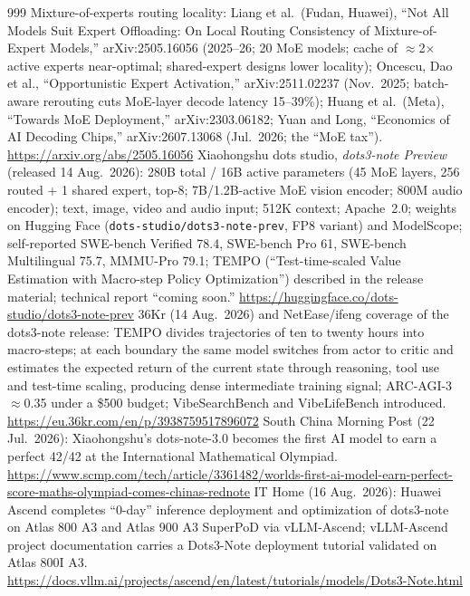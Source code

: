 \begin{thebibliography}{999}
 Mixture-of-experts routing locality: Liang et al.\ (Fudan, Huawei), ``Not All Models Suit Expert Offloading: On Local Routing Consistency of Mixture-of-Expert Models,'' arXiv:2505.16056 (2025--26; 20 MoE models; cache of $\approx$2$\times$ active experts near-optimal; shared-expert designs lower locality); Oncescu, Dao et al., ``Opportunistic Expert Activation,'' arXiv:2511.02237 (Nov.\ 2025; batch-aware rerouting cuts MoE-layer decode latency 15--39\%); Huang et al.\ (Meta), ``Towards MoE Deployment,'' arXiv:2303.06182; Yuan and Long, ``Economics of AI Decoding Chips,'' arXiv:2607.13068 (Jul.\ 2026; the ``MoE tax''). \url{https://arxiv.org/abs/2505.16056}
 Xiaohongshu dots studio, \emph{dots3-note Preview} (released 14 Aug.\ 2026): 280B total / 16B active parameters (45 MoE layers, 256 routed + 1 shared expert, top-8; 7B/1.2B-active MoE vision encoder; 800M audio encoder); text, image, video and audio input; 512K context; Apache~2.0; weights on Hugging Face (\texttt{dots-studio/dots3-note-prev}, FP8 variant) and ModelScope; self-reported SWE-bench Verified 78.4, SWE-bench Pro 61, SWE-bench Multilingual 75.7, MMMU-Pro 79.1; TEMPO (``Test-time-scaled Value Estimation with Macro-step Policy Optimization'') described in the release material; technical report ``coming soon.'' \url{https://huggingface.co/dots-studio/dots3-note-prev}
 36Kr (14 Aug.\ 2026) and NetEase/ifeng coverage of the dots3-note release: TEMPO divides trajectories of ten to twenty hours into macro-steps; at each boundary the same model switches from actor to critic and estimates the expected return of the current state through reasoning, tool use and test-time scaling, producing dense intermediate training signal; ARC-AGI-3 $\approx$0.35 under a \$500 budget; VibeSearchBench and VibeLifeBench introduced. \url{https://eu.36kr.com/en/p/3938759517896072}
 South China Morning Post (22 Jul.\ 2026): Xiaohongshu's dots-note-3.0 becomes the first AI model to earn a perfect 42/42 at the International Mathematical Olympiad. \url{https://www.scmp.com/tech/article/3361482/worlds-first-ai-model-earn-perfect-score-maths-olympiad-comes-chinas-rednote}
 IT Home (16 Aug.\ 2026): Huawei Ascend completes ``0-day'' inference deployment and optimization of dots3-note on Atlas 800 A3 and Atlas 900 A3 SuperPoD via vLLM-Ascend; vLLM-Ascend project documentation carries a Dots3-Note deployment tutorial validated on Atlas 800I A3. \url{https://docs.vllm.ai/projects/ascend/en/latest/tutorials/models/Dots3-Note.html}

\end{thebibliography}
